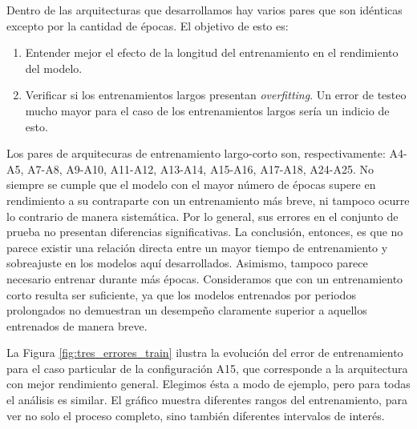 
Dentro de las arquitecturas que desarrollamos hay varios pares que son idénticas excepto por la cantidad de épocas. El objetivo de esto es:
\begin{enumerate}
    \item Entender mejor el efecto de la longitud del entrenamiento en el rendimiento del modelo.
    \item Verificar si los entrenamientos largos presentan \emph{overfitting}. Un error de testeo mucho mayor para el caso de los entrenamientos largos sería un indicio de esto.
\end{enumerate}
Los pares de arquitecuras de entrenamiento largo-corto son, respectivamente: A4-A5, A7-A8, A9-A10, A11-A12, A13-A14, A15-A16, A17-A18, A24-A25. No siempre se cumple que el modelo con el mayor número de épocas supere en rendimiento a su contraparte con un entrenamiento más breve, ni tampoco ocurre lo contrario de manera sistemática. Por lo general, sus errores en el conjunto de prueba no presentan diferencias significativas. La conclusión, entonces, es que no parece existir una relación directa entre un mayor tiempo de entrenamiento y sobreajuste en los modelos aquí desarrollados. Asimismo, tampoco parece necesario entrenar durante más épocas. Consideramos que con un entrenamiento corto resulta ser suficiente, ya que los modelos entrenados por periodos prolongados no demuestran un desempeño claramente superior a aquellos entrenados de manera breve.


La Figura \ref{fig:tres_errores_train} ilustra la evolución del error de entrenamiento para el caso particular de la configuración A15, que corresponde a la arquitectura con mejor rendimiento general. Elegimos ésta a modo de ejemplo, pero para todas el análisis es similar. El gráfico muestra diferentes rangos del entrenamiento, para ver no solo el proceso completo, sino también diferentes intervalos de interés.

